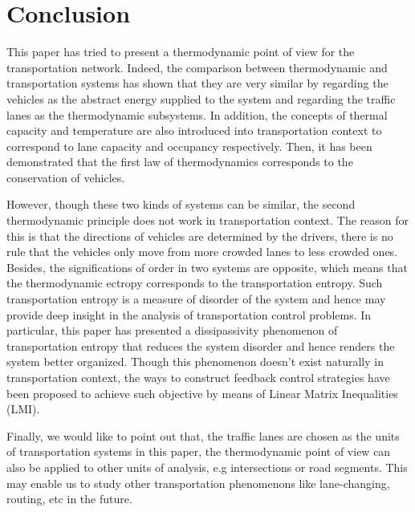 \documentclass[trsc,nonblindrev]{informs3} %
\begin{document}
\section{Conclusion}

This paper has tried  to present a thermodynamic point of view for the
transportation network. Indeed, the comparison between thermodynamic
and transportation systems has shown that they are very similar by
regarding the vehicles as the abstract energy supplied to the
system and regarding the traffic lanes
as the thermodynamic subsystems. In addition, the concepts of thermal
capacity and temperature are also introduced into transportation
context to correspond to lane capacity and occupancy respectively.
Then, it has been demonstrated that the first law of thermodynamics
corresponds to the conservation of vehicles.

However, though these two kinds of systems can be similar, the second
thermodynamic principle does not work in transportation context. The
reason for this is that  the directions of vehicles are determined by
the drivers, there is no rule that the vehicles only move from more
crowded lanes to less crowded ones. Besides, the significations of
order in two systems are opposite, which means that the thermodynamic
ectropy corresponds to the transportation entropy. Such
transportation entropy is a measure of disorder of the system and
hence may provide deep insight in the analysis of transportation
control problems.
In particular, this paper has presented a dissipassivity phenomenon
of transportation entropy that reduces the system disorder and hence
renders the system better organized.
Though this phenomenon doesn't exist naturally in transportation
context, the ways to construct feedback control strategies have been
proposed  to achieve such objective by means of Linear Matrix Inequalities (LMI).

Finally, we would like to point out that, the traffic lanes
are chosen as the units of transportation systems in this paper, the
thermodynamic point of view can also be applied to other units of
analysis, e.g intersections or road segments. This may enable us to
study other transportation phenomenons like lane-changing, routing,
etc in the future.
\end{document}
